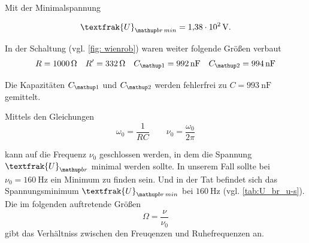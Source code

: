 Mit der Minimalspannung

\begin{equation*}
\textfrak{U}\ua{br\,min}=\SI{1.38e2}{\volt}.
\end{equation*}

In der Schaltung (vgl. \ref{fig: wienrob}) waren weiter folgende Größen verbaut
\begin{equation*}
R=\SI{1000}{\ohm} \quad R'=\SI{332}{\ohm} \quad C\ua{1}=\SI{992}{\nano\farad} \quad C\ua{2}=\SI{994}{\nano\farad}
\end{equation*}

Die Kapazitäten $C\ua{1}$ und $C\ua{2}$ werden fehlerfrei zu $C=\SI{993}{\nano\farad}$ gemittelt.

Mittels den Gleichungen
\begin{equation*}
\omega_{0}=\frac{1}{RC} \qquad \nu_{0}=\frac{\omega_0}{2\pi}
\end{equation*}

kann auf die Frequenz $\nu_{0}$ geschlossen werden, in dem die %
Spannung $\textfrak{U}\ua{br}$ minimal werden sollte.
In unserem Fall sollte bei $\nu_{0}=\SI{160}{\hertz}$ ein Minimum zu finden sein.
Und in der Tat befindet sich das Spannungsminimum $\textfrak{U}\ua{br\,min}$
bei $\SI{160}{\hertz}$ (vgl. \ref{tab:U_br_u-s}).
Die im folgenden auftretende Größen %
\begin{equation*}
\Omega=\frac{\nu}{\nu_0}
\end{equation*}
gibt das Verhältniss zwischen den Freuqenzen und Ruhefrequenzen an. %

